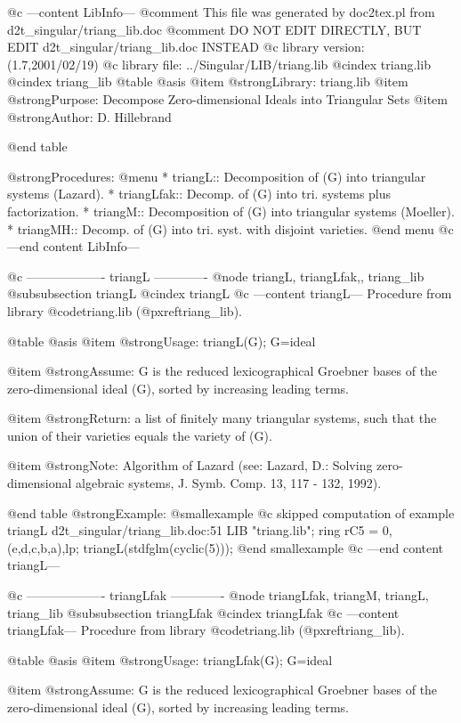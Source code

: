 @c ---content LibInfo---
@comment This file was generated by doc2tex.pl from d2t_singular/triang_lib.doc
@comment DO NOT EDIT DIRECTLY, BUT EDIT d2t_singular/triang_lib.doc INSTEAD
@c library version: (1.7,2001/02/19)
@c library file: ../Singular/LIB/triang.lib
@cindex triang.lib
@cindex triang_lib
@table @asis
@item @strong{Library:}
triang.lib
@item @strong{Purpose:}
   Decompose Zero-dimensional Ideals into Triangular Sets
@item @strong{Author:}
D. Hillebrand

@end table

@strong{Procedures:}
@menu
* triangL:: Decomposition of (G) into triangular systems (Lazard).
* triangLfak:: Decomp. of (G) into tri. systems plus factorization.
* triangM:: Decomposition of (G) into triangular systems (Moeller).
* triangMH:: Decomp. of (G) into tri. syst. with disjoint varieties.
@end menu
@c ---end content LibInfo---

@c ------------------- triangL -------------
@node triangL, triangLfak,, triang_lib
@subsubsection triangL
@cindex triangL
@c ---content triangL---
Procedure from library @code{triang.lib} (@pxref{triang_lib}).

@table @asis
@item @strong{Usage:}
triangL(G); G=ideal

@item @strong{Assume:}
G is the reduced lexicographical Groebner bases of the
zero-dimensional ideal (G), sorted by increasing leading terms.

@item @strong{Return:}
a list of finitely many triangular systems, such that
the union of their varieties equals the variety of (G).

@item @strong{Note:}
Algorithm of Lazard (see: Lazard, D.: Solving zero-dimensional
algebraic systems, J. Symb. Comp. 13, 117 - 132, 1992).

@end table
@strong{Example:}
@smallexample
@c skipped computation of example triangL d2t_singular/triang_lib.doc:51 
LIB "triang.lib";
ring rC5 = 0,(e,d,c,b,a),lp;
triangL(stdfglm(cyclic(5)));
@end smallexample
@c ---end content triangL---

@c ------------------- triangLfak -------------
@node triangLfak, triangM, triangL, triang_lib
@subsubsection triangLfak
@cindex triangLfak
@c ---content triangLfak---
Procedure from library @code{triang.lib} (@pxref{triang_lib}).

@table @asis
@item @strong{Usage:}
triangLfak(G); G=ideal

@item @strong{Assume:}
G is the reduced lexicographical Groebner bases of the
zero-dimensional ideal (G), sorted by increasing leading terms.

